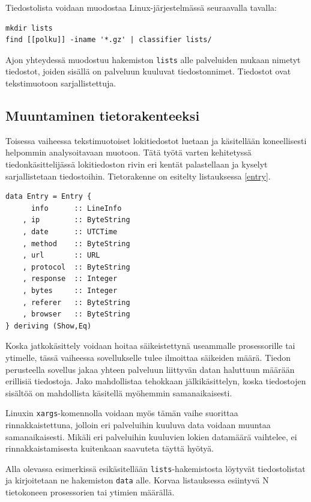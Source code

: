 Tiedostolista voidaan muodostaa
Linux-järjestelmässä seuraavalla tavalla:

\begin{lstlisting}[language=bashshell]
mkdir lists
find [[polku]] -iname '*.gz' | classifier lists/
\end{lstlisting} 

Ajon yhteydessä muodostuu hakemiston \texttt{lists} alle palveluiden
mukaan nimetyt tiedostot, joiden sisällä on palveluun kuuluvat
tiedostonnimet. Tiedostot ovat tekstimuotoon sarjallistettuja.

\subsection{Muuntaminen tietorakenteeksi}

Toisessa vaiheessa tekstimuotoiset lokitiedostot luetaan ja
käsitellään koneellisesti helpommin analysoitavaan muotoon. Tätä työtä
varten kehitetyssä tiedonkäsittelijässä lokitiedoston rivin eri kentät
palastellaan ja kyselyt sarjallistetaan tiedostoihin. Tietorakenne on
esitelty listauksessa \ref{entry}.

\lstset{language=MyHaskell}

\begin{lstlisting}[float=h,caption=Yhden lokirivin säilövä tietorakenne.,label=entry,aboveskip=1cm]
data Entry = Entry {
      info      :: LineInfo
    , ip        :: ByteString
    , date      :: UTCTime
    , method    :: ByteString
    , url       :: URL
    , protocol  :: ByteString
    , response  :: Integer
    , bytes     :: Integer
    , referer   :: ByteString
    , browser   :: ByteString
} deriving (Show,Eq)
\end{lstlisting}

Koska jatkokäsittely voidaan hoitaa säikeistettynä useammalle
prosessorille tai ytimelle, tässä vaiheessa sovellukselle tulee
ilmoittaa säikeiden määrä. Tiedon perusteella sovellus jakaa yhteen
palveluun liittyvän datan haluttuun määrään erillisiä tiedostoja. Jako
mahdollistaa tehokkaan jälkikäsittelyn, koska tiedostojen sisältöä on
mahdollista käsitellä myöhemmin samanaikaisesti.

Linuxin \texttt{xargs}-komennolla voidaan myös tämän vaihe suorittaa
rinnakkaistettuna, jolloin eri palveluihin kuuluva data voidaan
muuntaa samanaikaisesti. Mikäli eri palveluihin kuuluvien lokien datamäärä
vaihtelee, ei rinnakkaistamisesta kuitenkaan saavuteta täyttä hyötyä.

Alla olevassa esimerkissä esikäsitellään \texttt{lists}-hakemistosta
löytyvät tiedostolistat ja kirjoitetaan ne hakemiston \texttt{data}
alle. Korvaa listauksessa esiintyvä N tietokoneen prosessorien tai
ytimien määrällä. 

